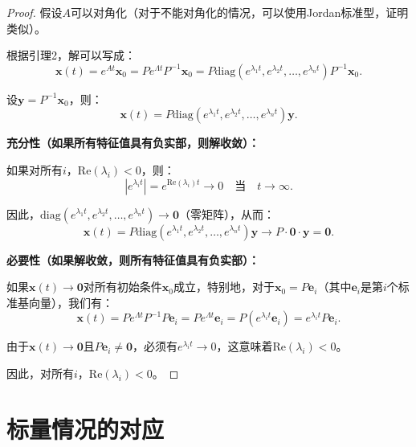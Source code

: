 \documentclass[12pt,a4paper]{article}
\newtheorem{proof}{证明}
\begin{document}
\begin{proof}
假设$A$可以对角化（对于不能对角化的情况，可以使用Jordan标准型，证明类似）。

根据引理2，解可以写成：
\begin{equation}
\mathbf{x}(t) = e^{At}\mathbf{x}_0 = Pe^{\Lambda t}P^{-1}\mathbf{x}_0 = P\text{diag}(e^{\lambda_1 t}, e^{\lambda_2 t}, \ldots, e^{\lambda_n t})P^{-1}\mathbf{x}_0.
\end{equation}

设$\mathbf{y} = P^{-1}\mathbf{x}_0$，则：
\begin{equation}
\mathbf{x}(t) = P\text{diag}(e^{\lambda_1 t}, e^{\lambda_2 t}, \ldots, e^{\lambda_n t})\mathbf{y}.
\end{equation}

\textbf{充分性（如果所有特征值具有负实部，则解收敛）：}

如果对所有$i$，$\text{Re}(\lambda_i) < 0$，则：
\begin{equation}
|e^{\lambda_i t}| = e^{\text{Re}(\lambda_i) t} \to 0 \quad \text{当} \quad t \to \infty.
\end{equation}

因此，$\text{diag}(e^{\lambda_1 t}, e^{\lambda_2 t}, \ldots, e^{\lambda_n t}) \to \mathbf{0}$（零矩阵），从而：
\begin{equation}
\mathbf{x}(t) = P\text{diag}(e^{\lambda_1 t}, e^{\lambda_2 t}, \ldots, e^{\lambda_n t})\mathbf{y} \to P \cdot \mathbf{0} \cdot \mathbf{y} = \mathbf{0}.
\end{equation}

\textbf{必要性（如果解收敛，则所有特征值具有负实部）：}

如果$\mathbf{x}(t) \to \mathbf{0}$对所有初始条件$\mathbf{x}_0$成立，特别地，对于$\mathbf{x}_0 = P\mathbf{e}_i$（其中$\mathbf{e}_i$是第$i$个标准基向量），我们有：
\begin{equation}
\mathbf{x}(t) = Pe^{\Lambda t}P^{-1}P\mathbf{e}_i = Pe^{\Lambda t}\mathbf{e}_i = P(e^{\lambda_i t}\mathbf{e}_i) = e^{\lambda_i t}P\mathbf{e}_i.
\end{equation}

由于$\mathbf{x}(t) \to \mathbf{0}$且$P\mathbf{e}_i \neq \mathbf{0}$，必须有$e^{\lambda_i t} \to 0$，这意味着$\text{Re}(\lambda_i) < 0$。

因此，对所有$i$，$\text{Re}(\lambda_i) < 0$。
\end{proof}

\section{标量情况的对应}
\end{document}

